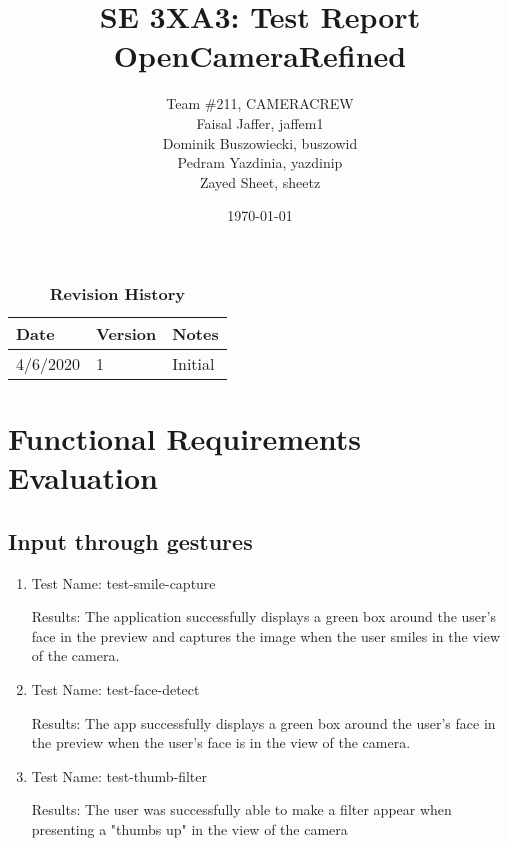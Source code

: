 \documentclass[12pt, titlepage]{article}
\title{SE 3XA3: Test Report\\OpenCameraRefined}
\author{Team \#211, CAMERACREW
		\\ Faisal Jaffer, jaffem1
		\\ Dominik Buszowiecki, buszowid
		\\ Pedram Yazdinia, yazdinip
		\\ Zayed Sheet, sheetz
}
\date{\today}
\begin{document}
\maketitle

\tableofcontents
\listoftables
\listoffigures
\newpage
\begin{table}[h]
\caption{\bf Revision History}
\begin{tabularx}{\textwidth}{p{3cm}p{2cm}X}
\toprule {\bf Date} & {\bf Version} & {\bf Notes}\\
\midrule
4/6/2020 & 1 & Initial\\
\bottomrule
\end{tabularx}
\end{table}

\newpage


\section{Functional Requirements Evaluation}
\subsection{Input through gestures}
\begin{enumerate}
    
    \item{Test Name: test-smile-capture}
    
     Results: The application successfully displays a green box around the user's face in the preview and captures the image when the user smiles in the view of the camera. \\
    
    \item{Test Name: test-face-detect}
    
    Results: The app successfully displays a green box around the user's face in the preview when the user's face is in the view of the camera. \\
    
    \item{Test Name: test-thumb-filter}
    
    Results: The user was successfully able to make a filter appear when presenting a "thumbs up" in the view of the camera\\
    
\end{enumerate}
\end{document}
